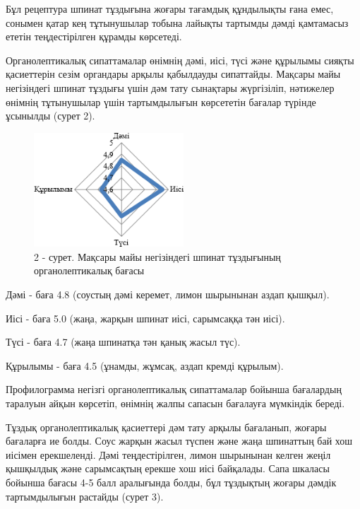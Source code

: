 \begin{multicols}{2}
Бұл рецептура шпинат тұздығына жоғары тағамдық құндылықты ғана емес,
сонымен қатар кең тұтынушылар тобына лайықты тартымды дәмді қамтамасыз
ететін теңдестірілген құрамды көрсетеді.

Органолептикалық сипаттамалар өнімнің дәмі, иісі, түсі және құрылымы
сияқты қасиеттерін сезім органдары арқылы қабылдауды сипаттайды. Мақсары
майы негізіндегі шпинат тұздығы үшін дәм тату сынақтары жүргізіліп,
нәтижелер өнімнің тұтынушылар үшін тартымдылығын көрсететін бағалар
түрінде ұсынылды (сурет 2).
\end{multicols}

\begin{figure}[H]
	\centering
	\includegraphics[width=0.5\textwidth]{media/pish3/image2}
	\caption*{2 - сурет. Мақсары майы негізіндегі шпинат тұздығының органолептикалық бағасы}
\end{figure}

\begin{multicols}{2}
Дәмі - баға 4.8 (соустың дәмі керемет, лимон шырынынан аздап қышқыл).

Иісі - баға 5.0 (жаңа, жарқын шпинат иісі, сарымсаққа тән иісі).

Түсі - баға 4.7 (жаңа шпинатқа тән қанық жасыл түс).

Құрылымы - баға 4.5 (ұнамды, жұмсақ, аздап кремді құрылым).

Профилограмма негізгі органолептикалық сипаттамалар бойынша бағалардың
таралуын айқын көрсетіп, өнімнің жалпы сапасын бағалауға мүмкіндік
береді.

Тұздық органолептикалық қасиеттері дәм тату арқылы бағаланып, жоғары
бағаларға ие болды. Соус жарқын жасыл түспен және жаңа шпинаттың бай хош
иісімен ерекшеленді. Дәмі теңдестірілген, лимон шырынынан келген жеңіл
қышқылдық және сарымсақтың ерекше хош иісі байқалады. Сапа шкаласы
бойынша бағасы 4-5 балл аралығында болды, бұл тұздықтың жоғары дәмдік
тартымдылығын растайды (сурет 3).
\end{multicols}

